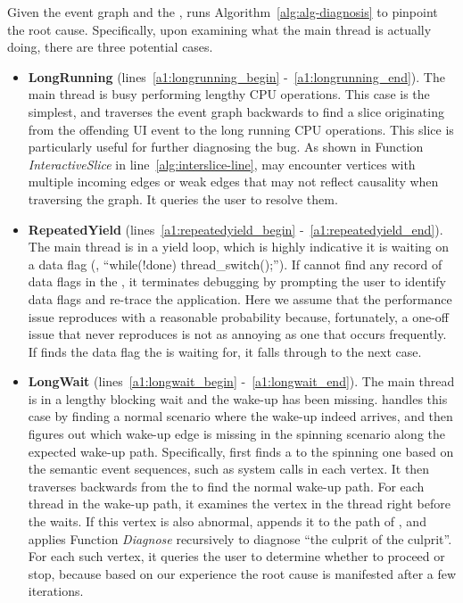 Given the event graph and the \spinningnode, \xxx runs
Algorithm~\ref{alg:alg-diagnosis} to pinpoint the root cause.  Specifically,
upon examining what the main thread is actually doing, there are three
potential cases.

\begin{itemize}
	\item \textbf{LongRunning} (lines~\ref{a1:longrunning_begin}
		-~\ref{a1:longrunning_end}). The main thread is busy performing lengthy
		CPU operations. This case is the simplest, and \xxx traverses the event
		graph backwards to find a slice originating from the offending UI event
		to the long running CPU operations. This slice is particularly useful for
		further diagnosing the bug. As shown in Function \textit{InteractiveSlice} in
		line~\ref{alg:interslice-line}, \xxx may encounter vertices with multiple
		incoming edges or weak edges that may not reflect causality when traversing
		the graph. It queries the user to resolve them.

	\item \textbf{RepeatedYield} (lines~\ref{a1:repeatedyield_begin}
		-~\ref{a1:repeatedyield_end}). The main thread is in a yield loop, which
		is highly indicative it is waiting on a data flag (\eg, ``while(!done)
		thread\_switch();''). If \xxx cannot find any record of data flags in the
		\spinningnode, it terminates debugging by prompting the user to identify data
		flags and re-trace the application. Here we assume that the performance issue
		reproduces with a reasonable probability because, fortunately, a one-off issue
		that never reproduces is not as annoying as one that occurs frequently. If
		\xxx finds the data flag the \spinningnode is waiting for, it falls through to
		the next case.

	\item \textbf{LongWait} (lines~\ref{a1:longwait_begin}
		-~\ref{a1:longwait_end}). The main thread is in a lengthy blocking wait and
		the wake-up has been missing. \xxx handles this case by finding a normal
		scenario where the wake-up indeed arrives, and then figures out which wake-up
		edge is missing in the spinning scenario along the expected wake-up path.
		Specifically, \xxx first finds a \similarnode to the spinning one based
		on the semantic event sequences, such as system calls in each vertex. It then traverses
		backwards from the \similarnode to find the normal wake-up path. For each
		thread in the wake-up path, it examines the vertex in the thread right before
		the \spinningnode waits. If this vertex is also abnormal, \xxx appends it
		to the path of \rootcausenodes, and applies Function \textit{Diagnose} recursively
		to diagnose ``the culprit of the culprit''. For each such vertex, it queries the
		user to determine whether to proceed or stop, because based on our experience
        the root cause is manifested after a few iterations.

\end{itemize}
